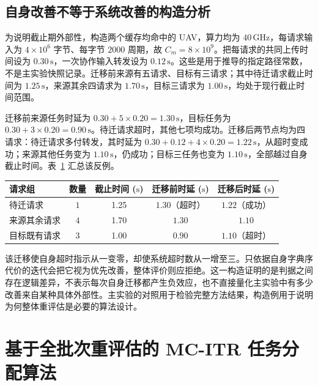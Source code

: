 \subsection{自身改善不等于系统改善的构造分析}
\label{sec:ch4-externality-example}

为说明截止期外部性，构造两个缓存均命中的 UAV，算力均为 $40\,\mathrm{GHz}$，每请求输入为 $4\times10^6$ 字节、每字节 $2000$ 周期，故 $C_m=8\times10^9$。把每请求的共同上传时间设为 $0.30\,\mathrm{s}$，一次协作输入转发设为 $0.12\,\mathrm{s}$。这些是用于推导的指定路径常数，不是主实验快照记录。迁移前来源有五请求、目标有三请求；其中待迁请求截止时间为 $1.25\,\mathrm{s}$，来源其余四请求为 $1.70\,\mathrm{s}$，目标三请求为 $1.00\,\mathrm{s}$，均处于现行截止时间范围。

迁移前来源任务时延为 $0.30+5\times0.20=1.30\,\mathrm{s}$，目标任务为 $0.30+3\times0.20=0.90\,\mathrm{s}$。待迁请求超时，其他七项均成功。迁移后两节点均为四请求：待迁请求多付转发，其时延为 $0.30+0.12+4\times0.20=1.22\,\mathrm{s}$，从超时变成功；来源其他任务变为 $1.10\,\mathrm{s}$，仍成功；目标三任务也变为 $1.10\,\mathrm{s}$，全部越过自身截止时间。表~\ref{tab:ch4-externality-example} 汇总该反例。

\begin{table}[!htbp]
 \centering
 \label{tab:ch4-externality-example}
 \begin{tabular}{lcccc}
 \toprule
 请求组 & 数量 & 截止时间 ($\mathrm{s}$) & 迁移前时延 ($\mathrm{s}$) & 迁移后时延 ($\mathrm{s}$)\\
 \midrule
 待迁请求 & $1$ & 1.25 & $1.30$（超时） & $1.22$（成功）\\
 来源其余请求 & $4$ & 1.70 & $1.30$ & $1.10$\\
 目标既有请求 & $3$ & 1.00 & $0.90$ & $1.10$（超时）\\
 \bottomrule
 \end{tabular}
\end{table}

该迁移使自身超时指示从一变零，却使系统超时数从一增至三。只依据自身字典序代价的迭代会把它视为优先改善，整体评价则应拒绝。这一构造证明的是判据之间存在逻辑差异，不表示每次自身迁移都产生负效应，也不直接量化主实验中有多少改善来自某种具体外部性。主实验的对照用于检验完整方法结果，构造例用于说明为何整体重评估是必要的算法设计。

\section{基于全批次重评估的 MC-ITR 任务分配算法}
\label{sec:mcitr-method}

